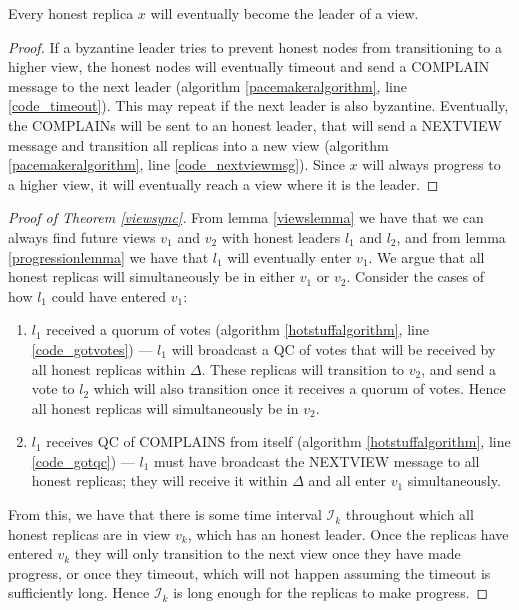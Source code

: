 \begin{lemma} \label{progressionlemma}
	Every honest replica $x$ will eventually become the leader of a view.
\end{lemma}

\begin{proof}
	If a byzantine leader tries to prevent honest nodes from transitioning to a higher view, the honest nodes will eventually timeout and send a COMPLAIN message to the next leader (algorithm \ref{pacemakeralgorithm}, line \ref{code_timeout}). This may repeat if the next leader is also byzantine. Eventually, the COMPLAINs will be sent to an honest leader, that will send a NEXT{\large V}IEW message and transition all replicas into a new view (algorithm \ref{pacemakeralgorithm}, line \ref{code_nextviewmsg}). Since $x$ will always progress to a higher view, it will eventually reach a view where it is the leader.
\end{proof}

\begin{proof}[Proof of Theorem \ref{viewsync}]
	From lemma \ref{viewslemma} we have that we can always find future views $v_1$ and $v_2$ with honest leaders $l_1$ and $l_2$, and from lemma \ref{progressionlemma} we have that $l_1$ will eventually enter $v_1$. We argue that all honest replicas will simultaneously be in either $v_1$ or $v_2$. Consider the cases of how $l_1$ could have entered $v_1$:
	\begin{enumerate}
		\item $l_1$ received a quorum of votes (algorithm \ref{hotstuffalgorithm}, line \ref{code_gotvotes}) --- $l_1$ will broadcast a QC of votes that will be received by all honest replicas within $\Delta$. These replicas will transition to $v_2$, and send a vote to $l_2$ which will also transition once it receives a quorum of votes. Hence all honest replicas will simultaneously be in $v_2$.
		\item $l_1$ receives QC of COMPLAINS from itself (algorithm \ref{hotstuffalgorithm}, line \ref{code_gotqc}) --- $l_1$ must have broadcast the NEXT{\large V}IEW message to all honest replicas; they will receive it within $\Delta$ and all enter $v_1$ simultaneously.
	\end{enumerate}
	From this, we have that there is some time interval $\mathcal{I}_k$ throughout which all honest replicas are in view $v_k$, which has an honest leader. Once the replicas have entered $v_k$ they will only transition to the next view once they have made progress, or once they timeout, which will not happen assuming the timeout is sufficiently long. Hence $\mathcal{I}_k$ is long enough for the replicas to make progress.
\end{proof}

